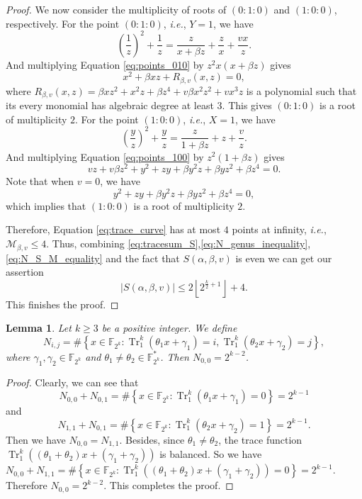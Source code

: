 \documentclass{article}
\newcommand{\F}{\mathbb{F}}
\newcommand{\0}{\textbf{0}}
\newcommand{\1}{\textbf{1}}
\newcommand{\TRACE}{\operatorname{Tr}_1^k}
\theoremstyle{plain}
\newtheorem{lemma}{Lemma}
\begin{document}
\begin{proof}
        We now consider the multiplicity of roots of $(0 : 1 : 0)$ and $(1 : 0 : 0)$, respectively.
        For the point $(0 : 1 : 0 )$, \emph{i.e.}, $Y = 1$, we have
        \begin{equation}\label{eq:points_010}
            \left( \frac{1}{z} \right)^2+\frac{1}{z}=\frac{z}{x+\beta z}+\frac{z}{x}+\frac{vx}{z}.
        \end{equation}
        And multiplying Equation \eqref{eq:points_010} by $z^2x(x+\beta z)$ gives
        \[x^2+\beta xz+R_{\beta,v}(x,z)=0,\]
        where $R_{\beta,v}(x,z)=\beta xz^2+x^2z+\beta z^4+v\beta x^2z^2+vx^3z$ is a polynomial
        such that its every monomial has algebraic degree at least $3$.
        This gives $(0 : 1 : 0)$ is a root of multiplicity $2$.
        For the point $(1 : 0 : 0)$, \emph{i.e.}, $X = 1$, we have
        \begin{equation}\label{eq:points_100}
            \left( \frac{y}{z} \right)^2+\frac{y}{z}=\frac{z}{1+\beta z}+z+\frac{v}{z}.
        \end{equation}
        And multiplying Equation \eqref{eq:points_100} by $z^2(1+\beta z)$ gives
        \[vz+v\beta z^2+y^2+zy+\beta y^2z+\beta yz^2+\beta z^4=0.\]
        Note that when $v=0$, we have
        \[y^2+zy+\beta y^2z+\beta yz^2+\beta z^4=0,\]
        which implies that $(1:0:0)$ is a root of multiplicity $2$.

        Therefore, Equation \eqref{eq:trace_curve} has at most $4$ points at infinity, \emph{i.e.},
        $\mathcal{M}_{\beta,v}\le 4$.
        Thus, combining \eqref{eq:tracesum_S},\eqref{eq:N_genus_inequality},\eqref{eq:N_S_M_equality} and the fact that
        $S(\alpha,\beta,v)$ is even we can get our assertion
        \[\left\lvert S(\alpha,\beta,v)\right\rvert \le 2\left\lfloor 2^{\frac{k}{2}+1}\right\rfloor+4.\]
        This finishes the proof.
    \end{proof}

    \begin{lemma}\label{lemma:N_ij_trace}
        Let $k\ge 3$ be a positive integer.  We define 
        \[ N_{i,j} =\#\left\{x\in\F_{2^k} : \TRACE\left(\theta_1x+\gamma_1\right)=i,\TRACE\left(\theta_2x+\gamma_2\right)=j\right\}, \]
        where  $\gamma_1,\gamma_2\in\F_{2^k}$ and $\theta_1\ne\theta_2\in\F_{2^k}^*$. Then $N_{0,0} =2^{k-2}$.
    \end{lemma}

   \begin{proof}
        Clearly, we can see that
        \[N_{0,0}+N_{0,1}=\#\left\{x\in\F_{2^k} : \TRACE\left(\theta_1x+\gamma_1\right)=0\right\}=2^{k-1}\]
        and
        \[N_{1,1}+N_{0,1}=\#\left\{x\in\F_{2^k} : \TRACE\left(\theta_2x+\gamma_2\right)=1\right\}=2^{k-1}.\]
        Then we have $N_{0,0} = N_{1,1}$.
        Besides, since $\theta_1\ne\theta_2$, the trace function $\TRACE\left((\theta_1+\theta_2)x+(\gamma_1+\gamma_2)\right)$ is balanced.
        So we have $N_{0,0}+N_{1,1} = \#\left\{x\in\F_{2^k} : \TRACE\left((\theta_1+\theta_2)x+(\gamma_1+\gamma_2)\right)=0\right\}=2^{k-1}$.
        Therefore $N_{0,0}=2^{k-2}$. This completes the proof.
   \end{proof}
\end{document}
